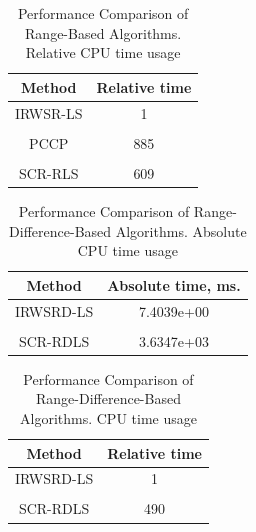 \begin{table}[h]
\label{tab:relR}
\centering
\caption{Performance Comparison of Range-Based Algorithms. Relative CPU time usage}
\phantom{m}
\begin{tabular}{|c|c|} 
\hline
Method &  Relative time\\ \hline
IRWSR-LS  & 1 \\&\\
PCCP & 885 \\&\\
SCR-RLS &  609  \\ %
\hline
\end{tabular}
\end{table}



\begin{table}[h]
\label{tab:absRD}
\centering
\caption{Performance Comparison of Range-Difference-Based Algorithms. Absolute CPU time usage}
\phantom{m}
\begin{tabular}{|c|c|} 
\hline
Method &  Absolute time, ms.\\ \hline
IRWSRD-LS  & 7.4039e+00 \\&\\
SCR-RDLS &  3.6347e+03  \\ %
\hline
\end{tabular}
\end{table}



\begin{table}[h]
\label{relRD}
\centering
\caption{Performance Comparison of Range-Difference-Based Algorithms. CPU time usage}
\phantom{m}
\begin{tabular}{|c|c|} 
\hline
Method &  Relative time\\ \hline
 IRWSRD-LS  & 1 \\&\\
SCR-RDLS &  490  \\ %
\hline
\end{tabular}
\end{table}
